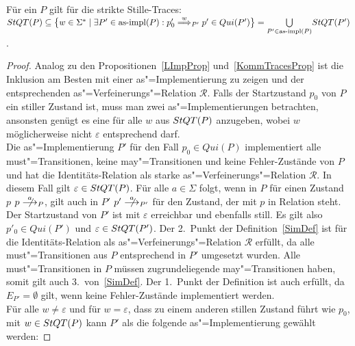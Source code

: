\begin{Prop}
  \label{StilleTraceProp}
  Für ein \MEIO{} $P$ gilt für die strikte Stille-Traces: $\StQT (P) \subseteq
  \big\{w\in\Sigma ^*\mid \exists P'\in\asimp (P): p'_0 \weakmust[w]_{P'}
  p'\in Qui(P')\big\} = \underset{P'\in\asimp (P)}{\bigcup} \StQT (P')$.
\end{Prop}
\begin{proof}
  Analog zu den Propositionen~\ref{LImpProp} und~\ref{KommTracesProp} ist die
  Inklusion am Besten mit einer as"=Implementierung zu zeigen und der
  entsprechenden as"=Verfeinerungs"=Relation $\mathcal{R}$. Falls der
  Startzustand $p_0$ von $P$ ein stiller Zustand ist, muss man zwei
  as"=Implementierungen betrachten, ansonsten genügt es eine für alle $w$ aus
  $StQT (P)$ anzugeben, wobei $w$ möglicherweise nicht $\varepsilon$
  entsprechend darf.\\
  Die as"=Implementierung $P'$ für den Fall $p_0\in Qui (P)$ implementiert alle
  must"=Transitionen, keine may"=Transitionen und keine Fehler-Zustände von $P$
  und hat die Identitäts-Relation als starke as"=Verfeinerungs"=Relation
  $\mathcal{R}$. In diesem Fall gilt $\varepsilon\in StQT (P)$. Für alle
  $a\in\Sigma$ folgt, wenn in $P$ für einen Zustand $p$ $p\nmust[a]_P$, gilt
  auch in $P'$ $p' \nmust[a]_{P'}$ für den Zustand, der mit $p$ in Relation
  steht. Der Startzustand von $P'$ ist mit $\varepsilon$ erreichbar und
  ebenfalls still. Es gilt also $p'_0\in Qui (P')$ und $\varepsilon\in StQT
  (P')$. Der 2.\ Punkt der Definition~\ref{SimDef} ist für die
  Identitäts-Relation als as"=Verfeinerungs"=Relation $\mathcal{R}$ erfüllt, da
  alle must"=Transitionen aus $P$ entsprechend in $P'$ umgesetzt wurden. Alle
  must"=Transitionen in $P$ müssen zugrundeliegende may"=Transitionen haben,
  somit gilt auch 3.\ von~\ref{SimDef}. Der 1.\ Punkt der Definition ist auch
  erfüllt, da $E_{P'}=\emptyset$ gilt, wenn keine Fehler-Zustände implementiert
  werden.\\
  Für alle $w\neq \varepsilon$ und für $w = \varepsilon$, dass zu einem anderen
  stillen Zustand führt wie $p_0$, mit $w\in StQT (P)$ kann $P'$ als die
  folgende as"=Implementierung gewählt werden:
\end{proof}
